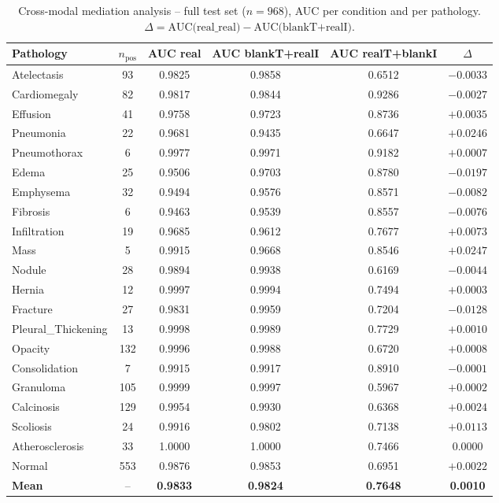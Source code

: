 \documentclass[11pt]{article}
\begin{document}
\begin{table}[H]
\centering
\small
\caption{Cross-modal mediation analysis -- full test set ($n=968$), AUC per
condition and per pathology. $\Delta = \text{AUC(real\_real)} -
\text{AUC(blankT+realI)}$.}
\begin{tabular}{lccccc}
\toprule
Pathology & $n_{\text{pos}}$ & AUC real & AUC blankT+realI & AUC realT+blankI & $\Delta$ \\
\midrule
Atelectasis         & 93  & 0.9825 & 0.9858 & 0.6512 & $-0.0033$ \\
Cardiomegaly        & 82  & 0.9817 & 0.9844 & 0.9286 & $-0.0027$ \\
Effusion            & 41  & 0.9758 & 0.9723 & 0.8736 & $+0.0035$ \\
Pneumonia           & 22  & 0.9681 & 0.9435 & 0.6647 & $+0.0246$ \\
Pneumothorax        & 6   & 0.9977 & 0.9971 & 0.9182 & $+0.0007$ \\
Edema               & 25  & 0.9506 & 0.9703 & 0.8780 & $-0.0197$ \\
Emphysema           & 32  & 0.9494 & 0.9576 & 0.8571 & $-0.0082$ \\
Fibrosis            & 6   & 0.9463 & 0.9539 & 0.8557 & $-0.0076$ \\
Infiltration        & 19  & 0.9685 & 0.9612 & 0.7677 & $+0.0073$ \\
Mass                & 5   & 0.9915 & 0.9668 & 0.8546 & $+0.0247$ \\
Nodule              & 28  & 0.9894 & 0.9938 & 0.6169 & $-0.0044$ \\
Hernia              & 12  & 0.9997 & 0.9994 & 0.7494 & $+0.0003$ \\
Fracture            & 27  & 0.9831 & 0.9959 & 0.7204 & $-0.0128$ \\
Pleural\_Thickening & 13  & 0.9998 & 0.9989 & 0.7729 & $+0.0010$ \\
Opacity             & 132 & 0.9996 & 0.9988 & 0.6720 & $+0.0008$ \\
Consolidation       & 7   & 0.9915 & 0.9917 & 0.8910 & $-0.0001$ \\
Granuloma           & 105 & 0.9999 & 0.9997 & 0.5967 & $+0.0002$ \\
Calcinosis          & 129 & 0.9954 & 0.9930 & 0.6368 & $+0.0024$ \\
Scoliosis           & 24  & 0.9916 & 0.9802 & 0.7138 & $+0.0113$ \\
Atherosclerosis     & 33  & 1.0000 & 1.0000 & 0.7466 & $0.0000$ \\
Normal              & 553 & 0.9876 & 0.9853 & 0.6951 & $+0.0022$ \\
\midrule
\textbf{Mean}       & --  & \textbf{0.9833} & \textbf{0.9824} & \textbf{0.7648} & \textbf{0.0010} \\
\bottomrule
\end{tabular}
\end{table}
\end{document}
